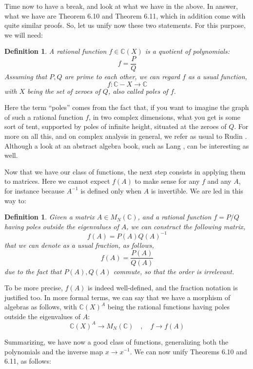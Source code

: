 \documentclass[12pt]{amsbook}
\newtheorem{definition}[theorem]{Definition}
\begin{document}
Time now to have a break, and look at what we have in the above. In answer, what we have are Theorem 6.10 and Theorem 6.11, which in addition come with quite similar proofs. So, let us unify now these two statements. For this purpose, we will need:

\begin{definition}
A rational function $f\in\mathbb C(X)$ is a quotient of polynomials:
$$f=\frac{P}{Q}$$
Assuming that $P,Q$ are prime to each other, we can regard $f$ as a usual function,
$$f:\mathbb C-X\to\mathbb C$$
with $X$ being the set of zeroes of $Q$, also called poles of $f$.
\end{definition}

Here the term ``poles'' comes from the fact that, if you want to imagine the graph of such a rational function $f$, in two complex dimensions, what you get is some sort of tent, supported by poles of infinite height, situated at the zeroes of $Q$. For more on all this, and on complex analysis in general, we refer as usual to Rudin \cite{ru2}. Although a look at an abstract algebra book, such as Lang \cite{la1}, can be interesting as well.

\bigskip

Now that we have our class of functions, the next step consists in applying them to matrices. Here we cannot expect $f(A)$ to make sense for any $f$ and any $A$, for instance because $A^{-1}$ is defined only when $A$ is invertible. We are led in this way to:

\begin{definition}
Given a matrix $A\in M_N(\mathbb C)$, and a rational function $f=P/Q$ having poles outside the eigenvalues of $A$, we can construct the following matrix,
$$f(A)=P(A)Q(A)^{-1}$$
that we can denote as a usual fraction, as follows,
$$f(A)=\frac{P(A)}{Q(A)}$$
due to the fact that $P(A),Q(A)$ commute, so that the order is irrelevant.
\end{definition}

To be more precise, $f(A)$ is indeed well-defined, and the fraction notation is justified too. In more formal terms, we can say that we have a morphism of algebras as follows, with $\mathbb C(X)^A$ being the rational functions having poles outside the eigenvalues of $A$:
$$\mathbb C(X)^A\to M_N(\mathbb C)\quad,\quad f\to f(A)$$

Summarizing, we have now a good class of functions, generalizing both the polynomials and the inverse map $x\to x^{-1}$. We can now unify Theorems 6.10 and 6.11, as follows:
\end{document}

